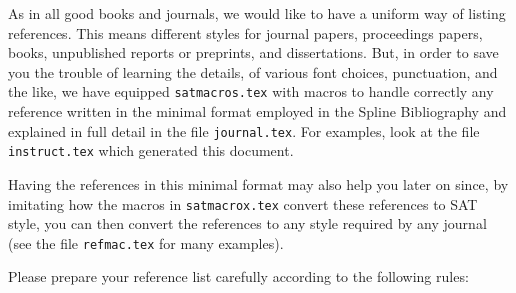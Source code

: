  As in all good books and journals, we would like
to have a uniform way of listing references. This means different
styles for journal papers, proceedings papers, books, unpublished
reports or preprints, and dissertations. But, in order to save you the
trouble of learning the details, of various font choices, punctuation, and
the like, we have equipped {\tt satmacros.tex} with macros to handle
correctly any reference written in the minimal format employed in the Spline
Bibliography and explained in full detail in the file {\tt journal.tex}.
For examples, look at the file {\tt instruct.tex} which generated this
document.

Having the references in this minimal format may also help you later on
since, by imitating how the macros in {\tt satmacrox.tex} convert these
references to SAT style, you can then convert the references to any style
required by any journal (see the file {\tt refmac.tex} for many examples).

Please prepare your reference list carefully according
to the following rules: \medskip

